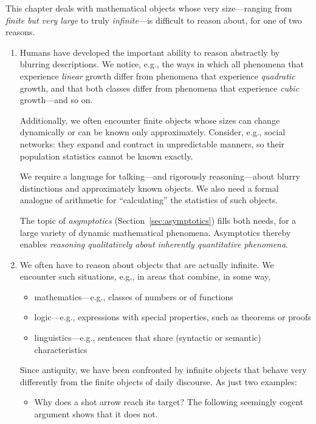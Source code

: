 This chapter deals with mathematical objects whose very size---ranging from {\em finite but very large} to truly {\em infinite}---is difficult to reason about, for one of two reasons.
\begin{enumerate}
\item
Humans have developed the important ability to reason abstractly by blurring descriptions.  We notice, e.g., the ways in which all phenomena that experience {\em linear} growth differ from phenomena that experience {\em quadratic} growth, and that both classes differ from phenomena that experience {\em cubic} growth---and so on.

\smallskip

Additionally, we often encounter finite objects whose sizes can change dynamically or can be known only approximately.  Consider, e.g., social networks: they expand and contract in unpredictable manners, so their population statistics cannot be known exactly.

\smallskip

We require a language for talking---and rigorously reasoning---about blurry distinctions and approximately known objects.  We also need a formal analogue of arithmetic for ``calculating'' the statistics of such objects.

\smallskip

The topic of {\it asymptotics} (Section~\ref{sec:asymptotics}) fills both needs, for a large variety of dynamic mathematical phenomena.  Asymptotics thereby enables {\em reasoning qualitatively about inherently quantitative phenomena}.

\medskip\item
We often have to reason about objects that are actually infinite.  We encounter such situations, e.g., in areas that combine, in some way,
  \begin{itemize}
  \item
mathematics---e.g., classes of numbers or of functions
  \medskip\item
logic---e.g., expressions with special properties, such as theorems or proofs
  \medskip\item
linguistics---e.g., sentences that share (syntactic or semantic) characteristics
  \end{itemize}
Since antiquity, we have been confronted by infinite objects that behave very differently from the finite objects of daily discourse.  As just two examples:
  \begin{itemize}
  \item
Why does a shot arrow reach its target?  The following seemingly cogent argument shows that it does not.


\end{itemize}
\end{enumerate}
